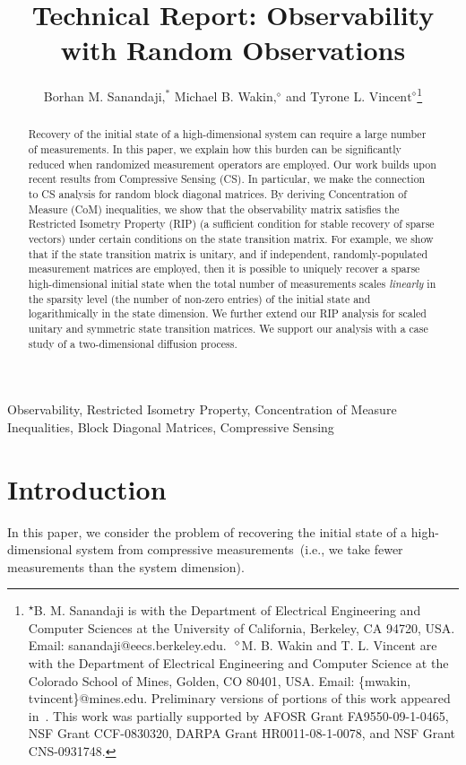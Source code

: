 \documentclass[11pt,draftcls,onecolumn]{IEEEtran}
\title{Technical Report: Observability \\with Random Observations}
\author{Borhan M. Sanandaj$\text{i,}^{*}$ Michael B. Waki$\text{n,}^{\diamond}$ and Tyrone L. Vincen$\text{t}^{\diamond}$\thanks{\textsuperscript{$\star$}B. M. Sanandaji is with the Department of Electrical Engineering and Computer Sciences at the University of California, Berkeley, CA 94720, USA. Email: sanandaji@eecs.berkeley.edu.~\textsuperscript{$\diamond$}M. B. Wakin and T. L. Vincent are with the Department of Electrical Engineering and Computer Science at the Colorado School of Mines, Golden, CO 80401, USA. Email: \{mwakin, tvincent\}@mines.edu. Preliminary versions of portions of this work appeared in~\cite{wakin2010observability}. This work was partially supported by AFOSR Grant FA9550-09-1-0465, NSF Grant CCF-0830320, DARPA Grant HR0011-08-1-0078, and NSF Grant CNS-0931748.}
}
\newcommand{\cut}[1]{}
\begin{document}
\maketitle

\begin{abstract}

Recovery of the initial state of a high-dimensional system can require a large number of measurements. In this paper, we explain how this burden can be significantly reduced when randomized measurement operators are employed. Our work builds upon recent results from Compressive Sensing (CS). In particular, we make the connection to CS analysis for random
block diagonal matrices.
By deriving Concentration of Measure (CoM) inequalities, we show that the observability matrix satisfies the Restricted Isometry Property (RIP) (a sufficient condition for stable recovery of sparse vectors) under certain conditions on the state transition matrix. For example, we show that if the state transition matrix is unitary, and if independent, randomly-populated measurement matrices are employed, then it is possible to uniquely recover a sparse high-dimensional initial state when the total number of measurements scales \emph{linearly} in the sparsity level (the number of non-zero entries) of the initial state and logarithmically in the state dimension. \cut{This is in fact a significant reduction in the sufficient total number of measurement for correct initial state recovery as compared to traditional observability theory.}We further extend our RIP analysis for scaled unitary and symmetric state transition matrices. We support our analysis with a case study of a two-dimensional diffusion process.
\end{abstract}



\begin{keywords}
Observability, Restricted Isometry Property, Concentration of Measure Inequalities, Block Diagonal Matrices, Compressive Sensing
\end{keywords}




\section{Introduction}
\label{sec:intro}

In this paper, we consider the problem of recovering the initial state of a high-dimensional system from
compressive measurements~(i.e., we take fewer measurements than the system dimension).
\end{document}
